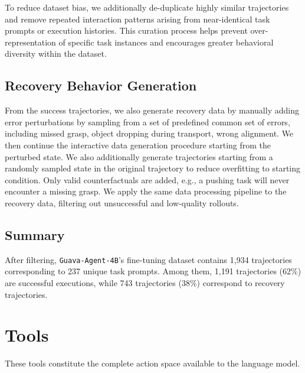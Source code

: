 \documentclass{llmxive}
\begin{document}
To reduce dataset bias, we additionally de-duplicate highly similar trajectories and remove repeated interaction patterns arising from near-identical task prompts or execution histories. This curation process helps prevent over-representation of specific task instances and encourages greater behavioral diversity within the dataset.

\subsection{Recovery Behavior Generation}

From the success trajectories, we also generate recovery data by manually adding error perturbations by sampling from a set of predefined common set of errors, including missed grasp, object dropping during transport, wrong alignment. We then continue the interactive data generation procedure starting from the perturbed state. We also additionally generate trajectories starting from a randomly sampled state in the original trajectory to reduce overfitting to starting condition. Only valid counterfactuals are added, e.g., a pushing task will never encounter a missing grasp. We apply the same data processing pipeline to the recovery data, filtering out unsuccessful and low-quality rollouts. 

\subsection{Summary}
After filtering, \texttt{Guava-Agent-4B}'s fine-tuning dataset contains 1,934 trajectories corresponding to 237 unique task prompts. Among them, 1,191 trajectories (62\%) are successful executions, while 743 trajectories (38\%) correspond to recovery trajectories. 

\section{Tools}

These tools constitute the complete action space available to the language model.
\end{document}
